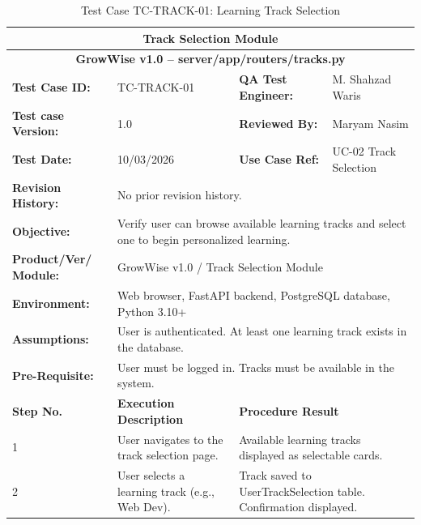 \documentclass{FastFyp}
\begin{document}
\vspace{0.5em}

\begin{table}[H]
\footnotesize
\centering
\caption{Test Case TC-TRACK-01: Learning Track Selection}
\label{tab:tctrack}
\begin{tabular}{|p{2.5cm}|p{4cm}|p{2.5cm}|p{4.5cm}|}
\hline
\multicolumn{4}{|c|}{\textbf{Track Selection Module}} \\ \hline
\multicolumn{4}{|c|}{\textbf{GrowWise v1.0 -- server/app/routers/tracks.py}} \\ \hline
\textbf{Test Case ID:} & TC-TRACK-01 & \textbf{QA Test Engineer:} & M. Shahzad Waris \\ \hline
\textbf{Test case Version:} & 1.0 & \textbf{Reviewed By:} & Maryam Nasim \\ \hline
\textbf{Test Date:} & 10/03/2026 & \textbf{Use Case Ref:} & UC-02 Track Selection \\ \hline
\textbf{Revision History:} & \multicolumn{3}{p{11cm}|}{No prior revision history.} \\ \hline
\textbf{Objective:} & \multicolumn{3}{p{11cm}|}{Verify user can browse available learning tracks and select one to begin personalized learning.} \\ \hline
\textbf{Product/Ver/ Module:} & \multicolumn{3}{p{11cm}|}{GrowWise v1.0 / Track Selection Module} \\ \hline
\textbf{Environment:} & \multicolumn{3}{p{11cm}|}{Web browser, FastAPI backend, PostgreSQL database, Python 3.10+} \\ \hline
\textbf{Assumptions:} & \multicolumn{3}{p{11cm}|}{User is authenticated. At least one learning track exists in the database.} \\ \hline
\textbf{Pre-Requisite:} & \multicolumn{3}{p{11cm}|}{User must be logged in. Tracks must be available in the system.} \\ \hline
\textbf{Step No.} & \textbf{Execution Description} & \multicolumn{2}{p{7cm}|}{\textbf{Procedure Result}} \\ \hline
1 & User navigates to the track selection page. & \multicolumn{2}{p{7cm}|}{Available learning tracks displayed as selectable cards.} \\ \hline
2 & User selects a learning track (e.g., Web Dev). & \multicolumn{2}{p{7cm}|}{Track saved to UserTrackSelection table. Confirmation displayed.} \\ \hline

\end{tabular}
\end{table}
\end{document}
